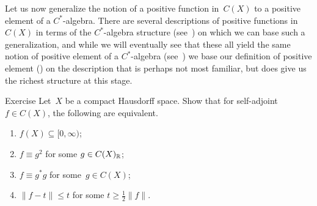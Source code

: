 \documentclass[main]{subfiles}
\begin{document}
\begin{parsec}%
\begin{point}%
Let us now generalize the notion of a positive function
in~$C(X)$
to a positive element of a $C^*$-algebra.
There are several descriptions of
positive functions in~$C(X)$ in terms of the $C^*$-algebra structure
(see~) on which we can base such a  generalization,
and while we will eventually see that these all yield the same notion
of positive element of a $C^*$-algebra (see~)
we base our definition of positive element ()
on the description that is perhaps
not most familiar,
but does give us the richest structure at this stage.
\end{point}
\begin{point}[cx-positive]{Exercise}%
Let~$X$ be a compact Hausdorff space.
Show that for self-adjoint $f\in C(X)$, the following are equivalent.
\begin{enumerate}
\item \label{cx-positive-1}
$f(X)\subseteq [0,\infty)$;
\item
$f\equiv g^2$ for some $g\in C(X)_{\mathbb{R}}$;
\item
$f\equiv g^* g$ for some~$g\in C(X)$;
\item
$\|f-t\|\leq t$ for some $t\geq \frac{1}{2}\|f\|$.


\end{enumerate}
\end{point}
\end{parsec}
\end{document}
